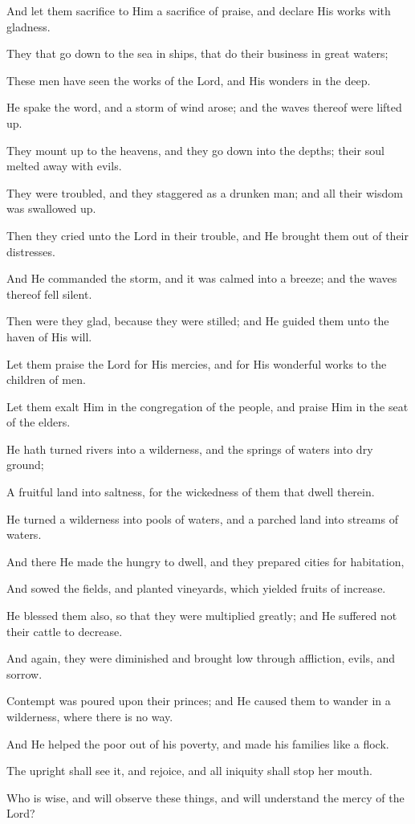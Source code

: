 And let them sacrifice to Him a sacrifice of praise, and declare His works with gladness.

They that go down to the sea in ships, that do their business in great waters;

These men have seen the works of the Lord, and His wonders in the deep.

He spake the word, and a storm of wind arose; and the waves thereof were lifted up.

They mount up to the heavens, and they go down into the depths; their soul melted away with evils.

They were troubled, and they staggered as a drunken man; and all their wisdom was swallowed up.

Then they cried unto the Lord in their trouble, and He brought them out of their distresses.

And He commanded the storm, and it was calmed into a breeze; and the waves thereof fell silent.

Then were they glad, because they were stilled; and He guided them unto the haven of His will.

Let them praise the Lord for His mercies, and for His wonderful works to the children of men.

Let them exalt Him in the congregation of the people, and praise Him in the seat of the elders.

He hath turned rivers into a wilderness, and the springs of waters into dry ground;

A fruitful land into saltness, for the wickedness of them that dwell therein.

He turned a wilderness into pools of waters, and a parched land into streams of waters.

And there He made the hungry to dwell, and they prepared cities for habitation,

And sowed the fields, and planted vineyards, which yielded fruits of increase.

He blessed them also, so that they were multiplied greatly; and He suffered not their cattle to decrease.

And again, they were diminished and brought low through affliction, evils, and sorrow.

Contempt was poured upon their princes; and He caused them to wander in a wilderness, where there is no way.

And He helped the poor out of his poverty, and made his families like a flock.

The upright shall see it, and rejoice, and all iniquity shall stop her mouth.

Who is wise, and will observe these things, and will understand the mercy of the Lord?
